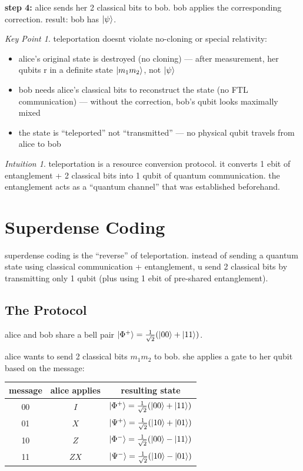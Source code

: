 \documentclass[11pt,a4paper]{article}
\theoremstyle{definition}
\theoremstyle{remark}
\newtheorem*{intuition}{Intuition}
\newtheorem*{keypoint}{Key Point}
\begin{document}
\textbf{step 4:} alice sends her 2 classical bits to bob. bob applies the corresponding correction. result: bob has $\ket{\psi}$.

\begin{keypoint}
teleportation doesnt violate no-cloning or special relativity:
\begin{itemize}
    \item alice's original state is destroyed (no cloning) --- after measurement, her qubits r in a definite state $\ket{m_1 m_2}$, not $\ket{\psi}$
    \item bob needs alice's classical bits to reconstruct the state (no FTL communication) --- without the correction, bob's qubit looks maximally mixed
    \item the state is ``teleported'' not ``transmitted'' --- no physical qubit travels from alice to bob
\end{itemize}
\end{keypoint}

\begin{intuition}
teleportation is a resource conversion protocol. it converts 1 ebit of entanglement + 2 classical bits into 1 qubit of quantum communication. the entanglement acts as a ``quantum channel'' that was established beforehand.
\end{intuition}

\section{Superdense Coding}

superdense coding is the ``reverse'' of teleportation. instead of sending a quantum state using classical communication + entanglement, u send 2 classical bits by transmitting only 1 qubit (plus using 1 ebit of pre-shared entanglement).

\subsection{The Protocol}

alice and bob share a bell pair $\ket{\Phi^+} = \frac{1}{\sqrt{2}}(\ket{00} + \ket{11})$.

alice wants to send 2 classical bits $m_1 m_2$ to bob. she applies a gate to her qubit based on the message:

\begin{center}
\begin{tabular}{c|c|c}
message & alice applies & resulting state \\
\hline
00 & $I$ & $\ket{\Phi^+} = \frac{1}{\sqrt{2}}(\ket{00} + \ket{11})$ \\
01 & $X$ & $\ket{\Psi^+} = \frac{1}{\sqrt{2}}(\ket{10} + \ket{01})$ \\
10 & $Z$ & $\ket{\Phi^-} = \frac{1}{\sqrt{2}}(\ket{00} - \ket{11})$ \\
11 & $ZX$ & $\ket{\Psi^-} = \frac{1}{\sqrt{2}}(\ket{10} - \ket{01})$ \\
\end{tabular}
\end{center}
\end{document}
